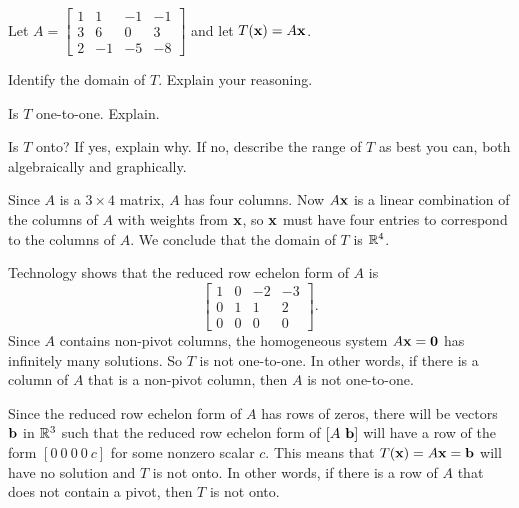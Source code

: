 \begin{example} Let $A = \left[ \begin{array}{crrr} 1&1&-1&-1 \\ 3&6&0&3 \\ 2&-1&-5&-8 \end{array} \right]$ and let $T(\mathbf{x}) = A\mathbf{x}$. 
	\ba
	\item Identify the domain of $T$. Explain your reasoning.
	
	\item Is $T$ one-to-one. Explain.
	
	\item Is $T$ onto? If yes, explain why. If no, describe the range of $T$ as best you can, both algebraically and graphically. 
	
	\ea

\ExampleSolution	
\ba
\item Since $A$ is a $3 \times 4$ matrix, $A$ has four columns. Now $A \mathbf{x}$ is a linear combination of the columns of $A$ with weights from $\mathbf{x}$, so $\mathbf{x}$ must have four entries to correspond to the columns of $A$. We conclude that the domain of $T$ is $\mathbb{R}^4$. 

\item Technology shows that the reduced row echelon form of $A$ is 
\[\left[ \begin{array}{ccrr} 1&0&-2&-3 \\ 0&1&1&2 \\ 0&0&0&0 \end{array} \right].\]
Since $A$ contains non-pivot columns, the homogeneous system $A \mathbf{x} = \mathbf{0}$ has infinitely many solutions. So $T$ is not one-to-one. In other words, if there is a column of $A$ that is a non-pivot column, then $A$ is not one-to-one.
	
\item Since the reduced row echelon form of $A$ has rows of zeros, there will be vectors $\mathbf{b}$ in $\mathbb{R}^3$ such that the reduced row echelon form of $[A \ \mathbf{b}]$ will have a row of the form $[0 \ 0  \ 0 \ 0 \ c]$ for some nonzero scalar $c$. This means that $T(\mathbf{x}) = A\mathbf{x} = \mathbf{b}$ will have no solution and $T$ is not onto. In other words, if there is a row of $A$ that does not contain a pivot, then $T$ is not onto. 


\end{example}
